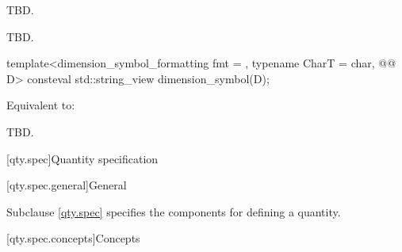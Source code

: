\begin{itemdescr}
\pnum
\effects
TBD.

\pnum
\returns
TBD.
\end{itemdescr}

\begin{itemdecl}
template<dimension_symbol_formatting fmt = {}, typename CharT = char, @@ D>
consteval std::string_view dimension_symbol(D);
\end{itemdecl}

\begin{itemdescr}
\pnum
\effects
Equivalent to:
\begin{codeblock}
TBD.
\end{codeblock}
\end{itemdescr}

[qty.spec]{Quantity specification}

[qty.spec.general]{General}

\pnum
Subclause \ref{qty.spec} specifies the components
for defining a quantity.

[qty.spec.concepts]{Concepts}

